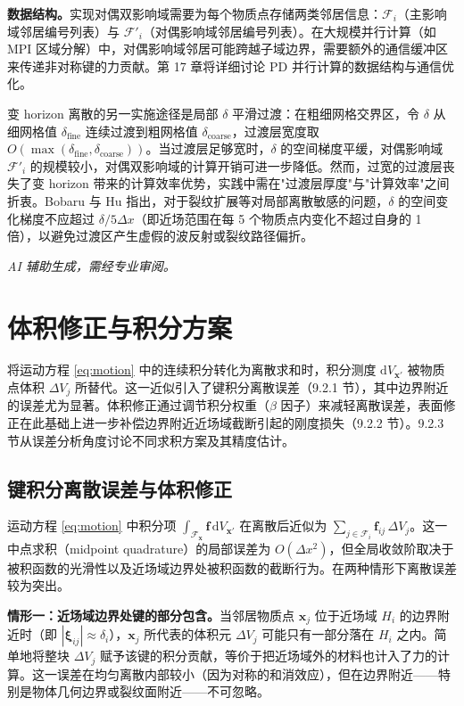 \textbf{数据结构。}实现对偶双影响域需要为每个物质点存储两类邻居信息：$\mathcal{F}_i$（主影响域邻居编号列表）与 $\mathcal{F}'_i$（对偶影响域邻居编号列表）。在大规模并行计算（如 MPI 区域分解）中，对偶影响域邻居可能跨越子域边界，需要额外的通信缓冲区来传递非对称键的力贡献。第 17 章将详细讨论 PD 并行计算的数据结构与通信优化。

变 horizon 离散的另一实施途径是局部 $\delta$ 平滑过渡：在粗细网格交界区，令 $\delta$ 从细网格值 $\delta_{\text{fine}}$ 连续过渡到粗网格值 $\delta_{\text{coarse}}$，过渡层宽度取 $O(\max(\delta_{\text{fine}},\delta_{\text{coarse}}))$。当过渡层足够宽时，$\delta$ 的空间梯度平缓，对偶影响域 $\mathcal{F}'_i$ 的规模较小，对偶双影响域的计算开销可进一步降低。然而，过宽的过渡层丧失了变 horizon 带来的计算效率优势，实践中需在"过渡层厚度"与"计算效率"之间折衷。Bobaru 与 Hu \cite{BobaruHu2012} 指出，对于裂纹扩展等对局部离散敏感的问题，$\delta$ 的空间变化梯度不应超过 $\delta/5\Delta x$（即近场范围在每 5 个物质点内变化不超过自身的 1 倍），以避免过渡区产生虚假的波反射或裂纹路径偏折。

\emph{AI 辅助生成，需经专业审阅。}

\section{体积修正与积分方案}\label{sec:disc-volume}

将运动方程 \eqref{eq:motion} 中的连续积分转化为离散求和时，积分测度 $\mathrm{d}V_{\mathbf{x}'}$ 被物质点体积 $\Delta V_j$ 所替代。这一近似引入了键积分离散误差（9.2.1 节），其中边界附近的误差尤为显著。体积修正通过调节积分权重（$\beta$ 因子）来减轻离散误差，表面修正在此基础上进一步补偿边界附近近场域截断引起的刚度损失（9.2.2 节）。9.2.3 节从误差分析角度讨论不同求积方案及其精度估计。

\subsection{键积分离散误差与体积修正}\label{sec:disc-quadrature-error}

运动方程 \eqref{eq:motion} 中积分项 $\int_{\mathcal{F}_{\mathbf{x}}}\mathbf{f}\,\mathrm{d}V_{\mathbf{x}'}$ 在离散后近似为 $\sum_{j\in\mathcal{F}_i}\mathbf{f}_{ij}\,\Delta V_j$。这一中点求积（midpoint quadrature）的局部误差为 $O(\Delta x^2)$，但全局收敛阶取决于被积函数的光滑性以及近场域边界处被积函数的截断行为。在两种情形下离散误差较为突出。

\textbf{情形一：近场域边界处键的部分包含。}当邻居物质点 $\mathbf{x}_j$ 位于近场域 $H_i$ 的边界附近时（即 $|\boldsymbol{\xi}_{ij}|\approx\delta_i$），$\mathbf{x}_j$ 所代表的体积元 $\Delta V_j$ 可能只有一部分落在 $H_i$ 之内。简单地将整块 $\Delta V_j$ 赋予该键的积分贡献，等价于把近场域外的材料也计入了力的计算。这一误差在均匀离散内部较小（因为对称的和消效应），但在边界附近——特别是物体几何边界或裂纹面附近——不可忽略。

